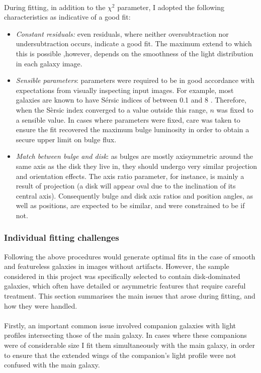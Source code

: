 \documentclass[11pt,twocolumn]{article}
\begin{document}
\paragraph{} 
During fitting, in addition to the $\chi^{2}$ parameter, I adopted the following characteristics as indicative of a good fit:
\begin{itemize}
\item{\emph{Constant residuals:} even residuals, where neither oversubtraction nor undersubtraction occurs, indicate a good fit. The maximum extend to which this is possible ,however, depends on the smoothness of the light distribution in each galaxy image.}
\item{\emph{Sensible parameters}: parameters were required to be in good accordance with expectations from visually inspecting input images. For example, most galaxies are known to have S\'{e}rsic indices of between 0.1 and 8 \cite{caon93}. Therefore, when the S\`{e}rsic index converged to a value outside this range, $n$ was fixed to a sensible value. In cases where parameters were fixed, care was taken to ensure the fit recovered the maximum bulge luminosity in order to obtain a secure upper limit on bulge flux. }
\item{\emph{Match between bulge and disk}: as bulges are mostly axisymmetric around the same axis as the disk they live in, they should undergo very similar projection and orientation effects. The axis ratio parameter, for instance, is mainly a result of projection (a disk will appear oval due to the inclination of its central axis). Consequently bulge and disk axis ratios and position angles, as well as positions, are expected to be similar, and were constrained to be if not.}
\end{itemize}

\subsubsection{Individual fitting challenges}\label{problems}
Following the above procedures would generate optimal fits in the case of smooth and featureless galaxies in images without artifacts. However, the sample considered in this project was specifically selected to contain disk-dominated galaxies, which often have detailed or asymmetric features that require careful treatment. This section summarises the main issues that arose during fitting, and how they were handled. 
\paragraph{} Firstly, an important common issue involved companion galaxies with light profiles intersecting those of the main galaxy. In cases where these companions were of considerable size  I fit them simultaneously with the main galaxy, in order to ensure that the extended wings of the companion's light profile were not confused with the main galaxy. 
\end{document}
